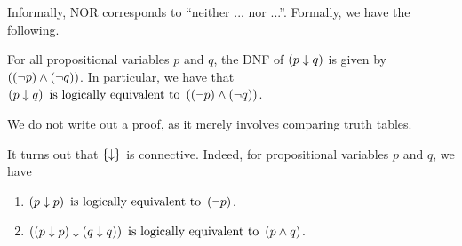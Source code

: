 Informally, NOR corresponds to ``neither ... nor ...''. Formally, we have the following.

\begin{boxlemma}
    For all propositional variables $p$ and $q$, the DNF of $\left( p \downarrow q \right)$ is given by $\left( \left( \neg p \right) \land \left( \neg q \right) \right)$. In particular, we have that $\left( p \downarrow q \right) \text{ is logically equivalent to } \left( \left( \neg p \right) \land \left( \neg q \right) \right)$.
\end{boxlemma}
We do not write out a proof, as it merely involves comparing truth tables.

\begin{boxexample}
    It turns out that $\left\{ \downarrow \right\}$ is connective. Indeed, for propositional variables $p$ and $q$, we have
    \begin{enumerate}
        \item $\left( p \downarrow p \right) \text{ is logically equivalent to } \left( \neg p \right)$.
        \item $\left( \left( p \downarrow p \right) \downarrow \left( q \downarrow q \right) \right) \text{ is logically equivalent to } \left( p \land q \right)$.
    \end{enumerate}
\end{boxexample}
